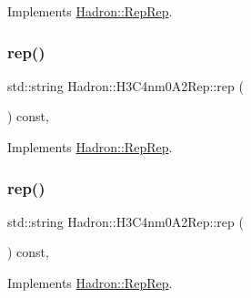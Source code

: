 Implements \mbox{\hyperlink{structHadron_1_1RepRep_ab3213025f6de249f7095892109575fde}{Hadron\+::\+Rep\+Rep}}.

\mbox{\label{structHadron_1_1H3C4nm0A2Rep_ab4e5ed700d7f03a7c2b8368304277671}} 
\subsubsection{\texorpdfstring{rep()}{rep()}\hspace{0.1cm}{\footnotesize\ttfamily [2/5]}}
{\footnotesize\ttfamily std\+::string Hadron\+::\+H3\+C4nm0\+A2\+Rep\+::rep (\begin{DoxyParamCaption}{ }\end{DoxyParamCaption}) const\hspace{0.3cm}{\ttfamily [inline]}, {\ttfamily [virtual]}}



Implements \mbox{\hyperlink{structHadron_1_1RepRep_ab3213025f6de249f7095892109575fde}{Hadron\+::\+Rep\+Rep}}.

\mbox{\label{structHadron_1_1H3C4nm0A2Rep_ab4e5ed700d7f03a7c2b8368304277671}} 
\subsubsection{\texorpdfstring{rep()}{rep()}\hspace{0.1cm}{\footnotesize\ttfamily [3/5]}}
{\footnotesize\ttfamily std\+::string Hadron\+::\+H3\+C4nm0\+A2\+Rep\+::rep (\begin{DoxyParamCaption}{ }\end{DoxyParamCaption}) const\hspace{0.3cm}{\ttfamily [inline]}, {\ttfamily [virtual]}}



Implements \mbox{\hyperlink{structHadron_1_1RepRep_ab3213025f6de249f7095892109575fde}{Hadron\+::\+Rep\+Rep}}.

\mbox{\label{structHadron_1_1H3C4nm0A2Rep_ab4e5ed700d7f03a7c2b8368304277671}} 
